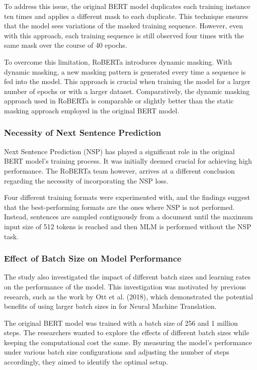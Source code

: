 \documentclass[a4paper,10pt]{report} %
\begin{document}
To address this issue, the original BERT model duplicates each training instance ten times and applies a different mask to each duplicate. This technique ensures that the model sees variations of the masked training sequence. However, even with this approach, each training sequence is still observed four times with the same mask over the course of 40 epochs.

To overcome this limitation, RoBERTa introduces dynamic masking. With dynamic masking, a new masking pattern is generated every time a sequence is fed into the model. This approach is crucial when training the model for a larger number of epochs or with a larger dataset. Comparatively, the dynamic masking approach used in RoBERTa is comparable or slightly better than the static masking approach employed in the original BERT model.

\subsubsection{Necessity of Next Sentence Prediction}
Next Sentence Prediction (NSP) has played a significant role in the original BERT model's training process. It was initially deemed crucial for achieving high performance. The RoBERTa team however, arrives at a different conclusion regarding the necessity of incorporating the NSP loss.

Four different training formats were experimented with, and the findings suggest that the best-performing formats are the ones where NSP is not performed. Instead, sentences are sampled contiguously from a document until the maximum input size of 512 tokens is reached and then MLM is performed without the NSP task.

\subsubsection{Effect of Batch Size on Model Performance}
The study also investigated the impact of different batch sizes and learning rates on the performance of the model. This investigation was motivated by previous research, such as the work by Ott et al. (2018), which demonstrated the potential benefits of using larger batch sizes in for Neural Machine Translation.

The original BERT model was trained with a batch size of 256 and 1 million steps. The researchers wanted to explore the effects of different batch sizes while keeping the computational cost the same. By measuring the model's performance under various batch size configurations and adjusting the number of steps accordingly, they aimed to identify the optimal setup.
\end{document}
